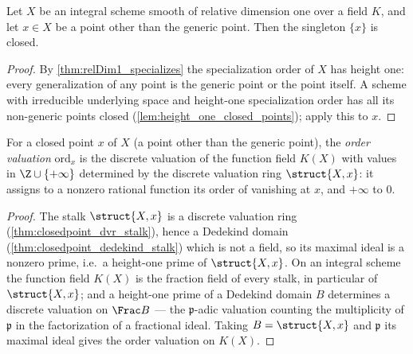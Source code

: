 \begin{theorem}
  \label{thm:closedpoint_isClosed}
  \leanok
  Let \(X\) be an integral scheme smooth of relative dimension one over a field \(K\), and let
  \(x \in X\) be a point other than the generic point. Then the singleton \(\{x\}\) is closed.
\end{theorem}
\begin{proof}
  \leanok
  By \ref{thm:relDim1_specializes} the specialization order of \(X\) has height one: every
  generalization of any point is the generic point or the point itself. A scheme with
  irreducible underlying space and height-one specialization order has all its non-generic
  points closed (\ref{lem:height_one_closed_points}); apply this to \(x\).
\end{proof}

\begin{definition}
  \label{def:scheme_ord}
  \leanok
  For a closed point \(x\) of \(X\) (a point other than the generic point), the
  \emph{order valuation} \(\mathrm{ord}_x\) is the discrete valuation of the function field
  \(K(X)\) with values in \(\Z \cup \{+\infty\}\) determined by the discrete valuation ring
  \(\struct{X,x}\): it assigns to a nonzero rational function its order of vanishing at \(x\),
  and \(+\infty\) to \(0\).
\end{definition}
\begin{proof}
  \leanok
  The stalk \(\struct{X,x}\) is a discrete valuation ring (\ref{thm:closedpoint_dvr_stalk}),
  hence a Dedekind domain (\ref{thm:closedpoint_dedekind_stalk}) which is not a field, so its
  maximal ideal is a nonzero prime, i.e.\ a height-one prime of \(\struct{X,x}\). On an integral
  scheme the function field \(K(X)\) is the fraction field of every stalk, in particular of
  \(\struct{X,x}\); and a height-one prime of a Dedekind domain \(B\) determines a discrete
  valuation on \(\Frac B\) --- the \(\mathfrak p\)-adic valuation counting the multiplicity of
  \(\mathfrak p\) in the factorization of a fractional ideal. Taking \(B = \struct{X,x}\) and
  \(\mathfrak p\) its maximal ideal gives the order valuation on \(K(X)\).
\end{proof}

